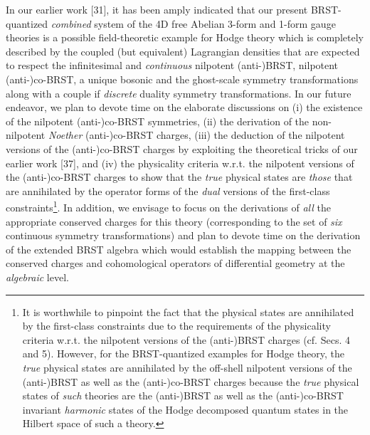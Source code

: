 \documentclass[12pt]{article}
\begin{document}
In our earlier work [31], it has been amply indicated that our present 
BRST-quantized {\it combined} system of the 4D free Abelian 3-form and 1-form gauge theories is a possible field-theoretic example for Hodge theory
which is completely described by the coupled (but equivalent) Lagrangian densities that 
are expected to respect the infinitesimal and {\it continuous}
nilpotent (anti-)BRST, nilpotent (anti-)co-BRST, a unique bosonic and the ghost-scale symmetry transformations along with a couple if {\it discrete} duality 
symmetry transformations. In our future endeavor, we plan to devote time on the elaborate discussions on (i) the 
existence of the nilpotent (anti-)co-BRST
symmetries, (ii) the derivation of the non-nilpotent {\it Noether} (anti-)co-BRST charges, (iii) the deduction of the nilpotent versions
of the (anti-)co-BRST charges by exploiting the theoretical tricks of our earlier work [37], and (iv) the physicality criteria w.r.t. 
the nilpotent versions of the (anti-)co-BRST charges to show that the {\it true} physical states are {\it those} that are annihilated by
the operator forms of the {\it dual} versions of the first-class constraints\footnote{It is worthwhile to pinpoint the fact that the
physical states are annihilated by the first-class constraints due to the requirements of the physicality criteria w.r.t. the nilpotent versions of
the (anti-)BRST charges (cf. Secs. 4 and 5). However, for the BRST-quantized examples for Hodge theory, the {\it true} physical states
are annihilated by the off-shell nilpotent versions of the (anti-)BRST as well as the
(anti-)co-BRST charges because the {\it true} physical states of {\it such} theories are the (anti-)BRST as well as the (anti-)co-BRST invariant 
{\it harmonic} states of the Hodge decomposed quantum states in the Hilbert space of such a theory.}. In addition, we 
envisage to focus on the derivations of {\it all} the appropriate conserved charges
for this theory (corresponding to the set of {\it six} continuous symmetry transformations) and plan to devote time on the derivation of the
extended BRST algebra which would establish the mapping between the conserved charges and cohomological operators of differential geometry
at the {\it algebraic} level.
\end{document}
